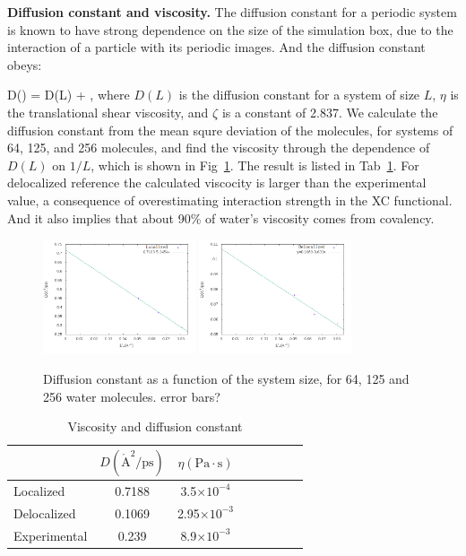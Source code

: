 \documentclass[prl,twocolumn,showpacs]{revtex4}
\begin{document}
\textbf{Diffusion constant and viscosity.} The diffusion constant for a periodic system is known to have strong dependence on the size of the simulation box, due to the interaction of a particle with its periodic images. And the diffusion constant obeys:

\bea
D(\infty) = D(L) + ,
\eea
where $D(L)$ is the diffusion constant for a system of size $L$, $\eta$ is the translational shear viscosity, and $\zeta$ is a constant of 2.837. We calculate the diffusion constant from the mean squre deviation of the molecules, for systems of 64, 125, and 256 molecules, and find the viscosity through the dependence of $D(L)$ on $1/L$, which is shown in Fig~\ref{Fig:dfs}. The result is listed in Tab~\ref{Tab:dfs}. For delocalized reference the calculated viscocity is larger than the experimental value, a consequence of overestimating interaction strength in the XC functional. And it also implies that about 90\% of water's viscosity comes from covalency.

\begin{figure}
\includegraphics[width=0.4\textwidth]{ALMO_0_msd}
\includegraphics[width=0.4\textwidth]{FULL_SCF_msd}
\caption{Diffusion constant as a function of the system size, for 64, 125 and 256 water molecules. \new error bars?\old }\label{Fig:dfs}
\end{figure} 

\begin{table}
\caption{Viscosity and diffusion constant}\label{Tab:dfs}
\begin{tabular}{l*{6}{c}r}
\hline
               & $D(\mathring{\text{A}}^2/\text{ps})$ & $\eta(\text{Pa}\cdot \text{s})$ \\
\hline
Localized                & 0.7188 & 3.5$\times 10^{-4}$ \\

Delocalized              & 0.1069 & 2.95$\times 10^{-3}$\\

Experimental            & 0.239  & 8.9$\times 10^{-3} $


\end{tabular}

\end{table}
\end{document}
